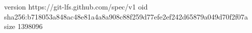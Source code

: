 version https://git-lfs.github.com/spec/v1
oid sha256:b718053a848ac48e81a4a8a908c88f259d77efe2ef242d65879a049d70f2f07a
size 1398096
